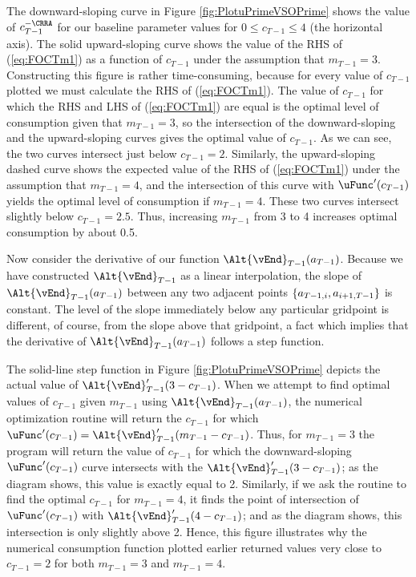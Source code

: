 \documentclass[titlepage, headings=optiontotocandhead]{\econtex}
\begin{document}
The downward-sloping curve in Figure \ref{fig:PlotuPrimeVSOPrime}
shows the value of ${c}_{T-1}^{-\CRRA}$ for our baseline parameter values
for $0 \leq {c}_{T-1} \leq 4$ (the horizontal axis).  The solid
upward-sloping curve shows the value of the RHS of (\ref{eq:FOCTm1})
as a function of ${c}_{T-1}$ under the assumption that ${m}_{T-1}=3$.
Constructing this figure is rather time-consuming, because for every
value of ${c}_{T-1}$ plotted we must calculate the RHS of
(\ref{eq:FOCTm1}).  The value of ${c}_{T-1}$ for which the RHS and LHS
of (\ref{eq:FOCTm1}) are equal is the optimal level of consumption
given that ${m}_{T-1}=3$, so the intersection of the downward-sloping
and the upward-sloping curves gives the optimal value of ${c}_{T-1}$.
As we can see, the two curves intersect just below ${c}_{T-1}=2$.
Similarly, the upward-sloping dashed curve shows the expected value
of the RHS of (\ref{eq:FOCTm1}) under the assumption that ${m}_{T-1}=4$,
and the intersection of this curve with $\uFunc^{\prime}({c}_{T-1})$ yields the
optimal level of consumption if ${m}_{T-1}=4$.  These two curves
intersect slightly below ${c}_{T-1}=2.5$.  Thus, increasing ${m}_{T-1}$
from 3 to 4 increases optimal consumption by about 0.5.

 Now consider the derivative of our function
$\Alt{\vEnd}_{T-1}({a}_{T-1})$.  Because we have constructed
$\Alt{\vEnd}_{T-1}$ as a linear interpolation, the slope of
$\Alt{\vEnd}_{T-1}({a}_{T-1})$ between any two adjacent
points $\{\null{a}_{T-1,i},{a}_{i+1,T-1}\}$ is constant.  The
level of the slope immediately below any particular gridpoint is
different, of course, from the slope above that gridpoint, a fact
which implies that the derivative of
$\Alt{\vEnd}_{T-1}({a}_{T-1})$ follows a step function.

The solid-line step function in Figure \ref{fig:PlotuPrimeVSOPrime}
depicts the actual value of
$\Alt{\vEnd}_{T-1}^{\prime}(3-{c}_{T-1})$.  When we attempt to find
optimal values of ${c}_{T-1}$ given ${m}_{T-1}$ using
$\Alt{\vEnd}_{T-1}({a}_{T-1})$, the numerical optimization
routine will return the ${c}_{T-1}$ for which $\uFunc^{\prime}({c}_{T-1}) =
\Alt{\vEnd}^{\prime}_{T-1}({m}_{T-1}-{c}_{T-1})$.  Thus, for
${m}_{T-1}=3$ the program will return the value of ${c}_{T-1}$ for
which the downward-sloping $\uFunc^{\prime}({c}_{T-1})$ curve intersects with the
$\Alt{\vEnd}_{T-1}^{\prime}(3-{c}_{T-1})$; as the diagram shows,
this value is exactly equal to 2.  Similarly, if we ask the routine
to find the optimal ${c}_{T-1}$ for ${m}_{T-1}=4$, it finds the point
of intersection of $\uFunc^{\prime}({c}_{T-1})$ with
$\Alt{\vEnd}_{T-1}^{\prime}(4-{c}_{T-1})$; and as the diagram shows,
this intersection is only slightly above 2.  Hence, this figure
illustrates why the numerical consumption function plotted earlier
returned values very close to ${c}_{T-1}=2$ for both ${m}_{T-1}=3$ and
${m}_{T-1}=4$.
\end{document}
